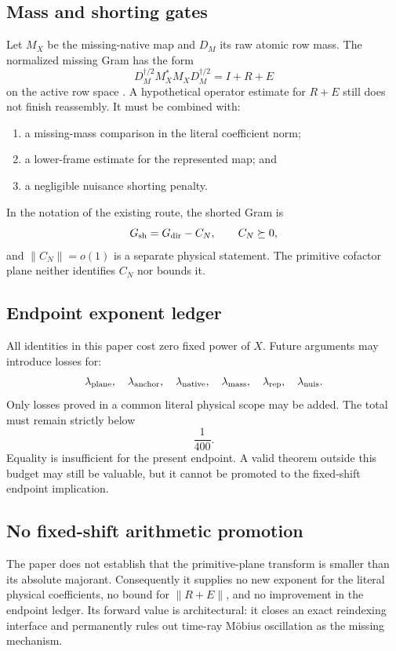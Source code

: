 \subsection{Mass and shorting gates}

Let \(M_X\) be the missing-native map and \(D_M\) its raw atomic row mass.
The normalized missing Gram has the form
\[
 D_M^{\dagger/2}M_X^*M_XD_M^{\dagger/2}
 =I+R+E
\]
on the active row space \citep{WangTPC61,WangTPC68}.  A hypothetical
operator estimate for \(R+E\) still does not finish reassembly.  It must
be combined with:
\begin{enumerate}[label=\textup{(\arabic*)},leftmargin=3em]
 \item a missing-mass comparison in the literal coefficient norm;
 \item a lower-frame estimate for the represented map; and
 \item a negligible nuisance shorting penalty.
\end{enumerate}
In the notation of the existing route, the shorted Gram is
\[
 G_{\rm sh}=G_{\rm dir}-C_N,\qquad C_N\succeq0,
\]
and \(\|C_N\|=o(1)\) is a separate physical statement.  The primitive
cofactor plane neither identifies \(C_N\) nor bounds it.

\subsection{Endpoint exponent ledger}

All identities in this paper cost zero fixed power of \(X\).  Future
arguments may introduce losses for:
\[
 \lambda_{\rm plane},\quad
 \lambda_{\rm anchor},\quad
 \lambda_{\rm native},\quad
 \lambda_{\rm mass},\quad
 \lambda_{\rm rep},\quad
 \lambda_{\rm nuis}.
\]
Only losses proved in a common literal physical scope may be added.  The
total must remain strictly below
\[
 \frac1{400}.
\]
Equality is insufficient for the present endpoint.  A valid theorem
outside this budget may still be valuable, but it cannot be promoted to
the fixed-shift endpoint implication.

\subsection{No fixed-shift arithmetic promotion}

The paper does not establish that the primitive-plane transform is
smaller than its absolute majorant.  Consequently it supplies no new
exponent for the literal physical coefficients, no bound for
\(\|R+E\|\), and no improvement in the endpoint ledger.  Its forward
value is architectural: it closes an exact reindexing interface and
permanently rules out time-ray M\"obius oscillation as the missing
mechanism.
